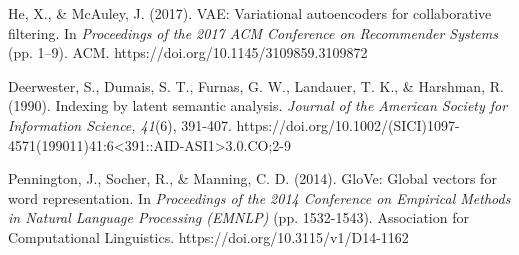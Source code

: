 \documentclass{article}
\begin{document}
\begin{thebibliography}{99}
 He, X., \& McAuley, J. (2017). VAE: Variational autoencoders for collaborative filtering. In \textit{Proceedings of the 2017 ACM Conference on Recommender Systems} (pp. 1–9). ACM. https://doi.org/10.1145/3109859.3109872

 Deerwester, S., Dumais, S. T., Furnas, G. W., Landauer, T. K., \& Harshman, R. (1990). Indexing by latent semantic analysis. \textit{Journal of the American Society for Information Science, 41}(6), 391-407. https://doi.org/10.1002/(SICI)1097-4571(199011)41:6<391::AID-ASI1>3.0.CO;2-9

 Pennington, J., Socher, R., \& Manning, C. D. (2014). GloVe: Global vectors for word representation. In \textit{Proceedings of the 2014 Conference on Empirical Methods in Natural Language Processing (EMNLP)} (pp. 1532-1543). Association for Computational Linguistics. https://doi.org/10.3115/v1/D14-1162

\end{thebibliography}
\end{document}
